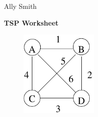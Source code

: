 \documentclass[12pt]{article}
\begin{document}
\newcommand{\I}{\mbox{{\em Int}}}
\newcommand{\lt}{\mbox{{\em left}}}
\newcommand{\rt}{\mbox{{\em right}}}
\newcommand{\ld}{\Delta^l}
\newcommand{\rd}{\Delta^r}
\newcommand{\lsp}[1]{\large\renewcommand{\baselinestretch}{#1}\normalsize}
\newcommand{\hsp}{\hspace{.2in}}

\def\Endwhile{\mbox{\bf endwhile\ }}
\def\Or{\mbox{\bf or\ }}
\def\Do{\mbox{\bf do\ }}
\def\Downto{\mbox{\bf downto\ }}
\def\Int{\mbox{\bf int\ }}
\def\To{\mbox{\bf to\ }}
\def\Repeat{\mbox{\bf repeat\ }}
\def\Until{\mbox{\bf until\ }}
\def\Return{\mbox{\bf return\ }}
\def\Not{\mbox{\bf not\ }}
\def\And{\mbox{\bf and\ }}
\def\For{\mbox{\bf for\ }}
\def\Foreach{\mbox{\bf foreach\ }}
\def\Else{\mbox{\bf else\ }}
\def\Elseif{\mbox{\bf elseif\ }}
\def\End{\mbox{\bf end\ }}
\def\If{\mbox{\bf if\ }}
\def\Mod{\mbox{\bf \ mod\ }}
\def\Then{\mbox{\bf then\ }}
\def\While{\mbox{\bf while\ }}
\def\Output{\mbox{\bf output\ }}


\lsp{1}
\pagestyle{plain}
\hfill Ally Smith
\begin{center}
{\bf
TSP Worksheet
}
\end{center}

\begin{figure}[h]
\center
\includegraphics[width=1.5in]{TSPfig.pdf}
\end{figure}
\end{document}
